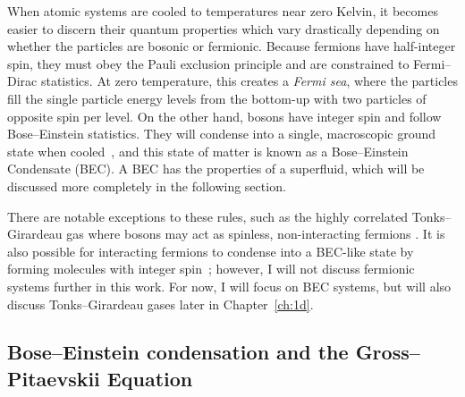 When atomic systems are cooled to temperatures near zero Kelvin, it becomes easier to discern their quantum properties which vary drastically depending on whether the particles are bosonic or fermionic.
Because fermions have half-integer spin, they must obey the Pauli exclusion principle and are constrained to Fermi--Dirac statistics.
At zero temperature,
this creates a \textit{Fermi sea}, where the particles fill the single particle energy levels from the bottom-up with two particles of opposite spin per level.
On the other hand, bosons have integer spin and follow Bose--Einstein statistics.
They will condense into a single, macroscopic ground state when cooled~\cite{einstein1925, fetter2003}, and
this state of matter is known as a Bose--Einstein Condensate (BEC).
A BEC has the properties of a superfluid, which will be discussed more completely in the following section.

There are notable exceptions to these rules, such as the highly correlated Tonks--Girardeau gas where bosons may act as spinless, non-interacting fermions \cite{girardeau1960, schloss2016}.
It is also possible for interacting fermions to condense into a BEC-like state by forming molecules with integer spin~\cite{nozieres1985, bulgac2014}; however, I will not discuss fermionic systems further in this work.
For now, I will focus on BEC systems, but will also discuss Tonks--Girardeau gases later in Chapter~\ref{ch:1d}.

\subsection{Bose--Einstein condensation and the Gross--Pitaevskii Equation}

